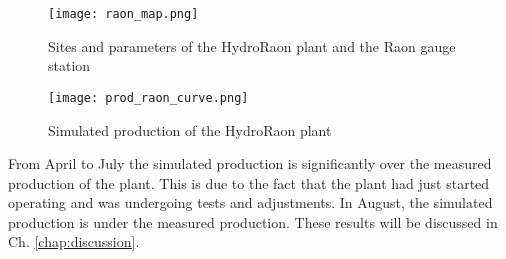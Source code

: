 \begin{figure}[H]
\centering
\texttt{[image: raon\_map.png]}
\caption{Sites and parameters of the HydroRaon plant and the Raon gauge station}
\label{raon_map}
\end{figure}

\begin{figure}[H]
\centering
\texttt{[image: prod\_raon\_curve.png]}
\caption{Simulated production of the HydroRaon plant}
\label{prod_raon_curve}
\end{figure}

From April to July the simulated production is significantly over the measured production of the plant. This is due to the fact that the plant had just started operating and was undergoing tests and adjustments. In August, the simulated production is under the measured production. These results will be discussed in Ch. \ref{chap:discussion}.

